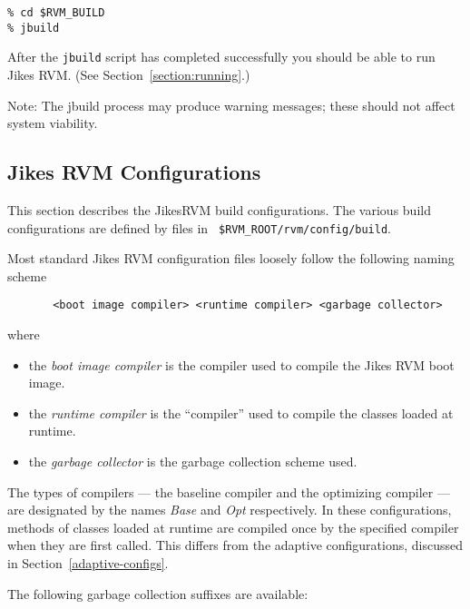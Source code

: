 \begin{enumerate}
\begin{verbatim}
% cd $RVM_BUILD
% jbuild
\end{verbatim}


After the {\tt jbuild} script has completed successfully you should be able 
to run Jikes RVM.  (See Section~\ref{section:running}.)

Note: The jbuild process may produce warning messages; these should not
affect system viability.

\end{enumerate}

\AIXPPCJikesTMFooter

\subsection{Jikes RVM Configurations}\label{configs}

This section describes the Jikes\trademark RVM build configurations.
The various 
build configurations are defined by files in {\tt
\$RVM\_ROOT/rvm/config/build}.

Most standard Jikes RVM configuration files loosely follow the
following naming scheme 
\begin{verbatim}
       <boot image compiler> <runtime compiler> <garbage collector>
\end{verbatim}

where
\begin{itemize}
\item the {\em boot image compiler} is the compiler used to compile
the Jikes RVM boot image. 
\item the {\em runtime compiler} is the ``compiler'' used to compile
the classes loaded at runtime.  
\item the {\em garbage collector} is the garbage collection scheme used.
\end{itemize}

The types of compilers --- the baseline compiler and 
the optimizing compiler --- are designated by the names {\em Base}
and {\em Opt} respectively.  In these configurations,
methods of classes loaded at runtime are compiled once by the specified
compiler when they are first called.
This differs from the adaptive configurations,
discussed in Section~\ref{adaptive-configs}.

The following garbage collection suffixes are available:

